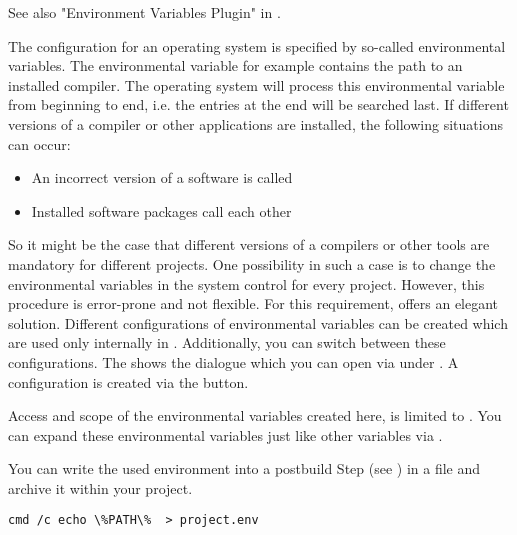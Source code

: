 See also "Environment Variables Plugin" in .

The configuration for an operating system is specified by so-called environmental variables. The environmental variable  for example contains the path to an installed compiler. The operating system will process this environmental variable from beginning to end, i.e. the entries at the end will be searched last. If different versions of a compiler or other applications are installed, the following situations can occur:

\begin{itemize}
\item An incorrect version of a software is called
\item Installed software packages call each other
\end{itemize}

So it might be the case that different versions of a compilers or other tools are mandatory for different projects. One possibility in such a case is to change the environmental variables in the system control for every project. However, this procedure is error-prone and not flexible. For this requirement, \codeblocks offers an elegant solution. Different configurations of environmental variables can be created which are used only internally in \codeblocks. Additionally, you can switch between these configurations. The  shows the dialogue which you can open via  under . A configuration is created via the  button.


Access and scope of the environmental variables created here, is limited to \codeblocks. You can expand these environmental variables just like other \codeblocks variables via .



You can write the used environment into a postbuild Step (see ) in a file  and archive it within your project.

\begin{lstlisting}
cmd /c echo \%PATH\%  > project.env
\end{lstlisting}

